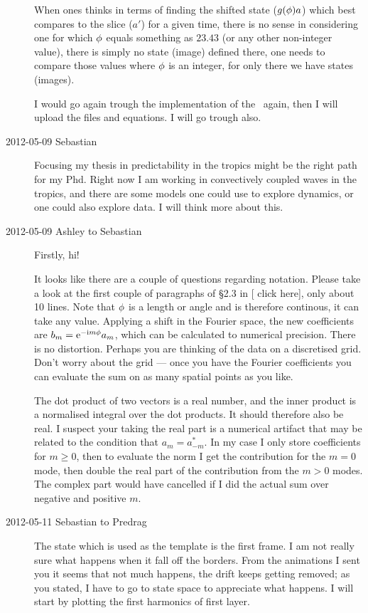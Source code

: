 \begin{description}
When ones thinks in terms of finding the shifted state ($g({\bf \phi})
a$) which best compares to the slice ($a'$) for a given time, there is no
sense in considering one for which ${\bf \phi}$ equals something as $23.43$
(or any other non-integer value), there is simply no state (image)
defined there, one needs to compare those values where ${\bf \phi}$ is an
integer, for only there we have states (images).

I would go again trough the implementation of the \chartBord\ again,
then I will upload the files and equations. I will go trough
 also.

\item[2012-05-09 Sebastian]
Focusing my thesis in predictability in the tropics might be the right
path for my Phd. Right now I am working in convectively coupled waves in
the tropics, and there are some models one could use to explore dynamics,
or one could also explore data. I will think more about this.

\item[2012-05-09 Ashley to Sebastian]
Firstly, hi!

It looks like there are a couple of questions regarding notation.
Please take a look at the first couple of paragraphs of \S2.3 in
\rf{ACHKW11}
[
{click here}],
only about 10 lines. Note that ${\bf \phi}$ is a length or angle and is
therefore continous, it can take any value. Applying a shift in the
Fourier space, the new coefficients are
$b_m=\mathrm{e}^{-\mathrm{i}m{\bf \phi}}a_m$, which can be calculated to
numerical precision. There is no distortion. Perhaps you are thinking of
the data on a discretised grid.  Don't worry about the grid --- once you
have the Fourier coefficients you can evaluate the sum on as many spatial
points as you like.

The dot product of two vectors is a real number, and the inner product is
a normalised integral over the dot products.  It should therefore also be
real.  I suspect your taking the real part is a numerical artifact that
may be related to the condition that $a_m=a^*_{-m}$.  In my case I only
store coefficients for $m\ge 0$, then to evaluate the norm I get the
contribution for the $m=0$ mode, then double the real part of the
contribution from the $m>0$ modes.  The complex part would have cancelled
if I did the actual sum over negative and positive $m$.

\item[2012-05-11 Sebastian to Predrag]
The state which is used as the template is the first frame. I am not
really sure what happens when it fall off the borders. From the
animations I sent you it seems that not much happens, the drift keeps
getting removed; as you stated, I have to go to state space to appreciate
what happens. I will start by plotting the first harmonics of first
layer.


\end{description}
